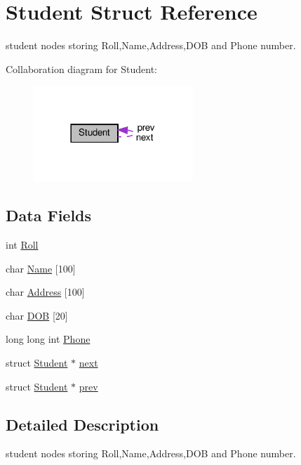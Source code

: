 \hypertarget{struct_student}{}\section{Student Struct Reference}
\label{struct_student}


student nodes storing Roll,Name,Address,D\+OB and Phone number.  




Collaboration diagram for Student\+:
\nopagebreak
\begin{figure}[H]
\begin{center}
\leavevmode
\includegraphics[width=170pt]{struct_student__coll__graph}
\end{center}
\end{figure}
\subsection*{Data Fields}
\begin{DoxyCompactItemize}
\item 
int \hyperlink{struct_student_abf08303c7c1c86949317530985b66f65}{Roll}
\item 
char \hyperlink{struct_student_a6b7a07c8ee9c9f38664df19619d58228}{Name} \mbox{[}100\mbox{]}
\item 
char \hyperlink{struct_student_ac8b69a306e0bda4dbd3ff7195b193577}{Address} \mbox{[}100\mbox{]}
\item 
char \hyperlink{struct_student_ac7f4f37722482a16f12dc314d0d1360f}{D\+OB} \mbox{[}20\mbox{]}
\item 
long long int \hyperlink{struct_student_a097ef0dc0739c67e89950dec9f3c1446}{Phone}
\item 
struct \hyperlink{struct_student}{Student} $\ast$ \hyperlink{struct_student_a6a280e6c00fedbc058905a9b06e2bc91}{next}
\item 
struct \hyperlink{struct_student}{Student} $\ast$ \hyperlink{struct_student_acccaf7a7261d26814e081163b772728f}{prev}
\end{DoxyCompactItemize}


\subsection{Detailed Description}
student nodes storing Roll,Name,Address,D\+OB and Phone number. 

